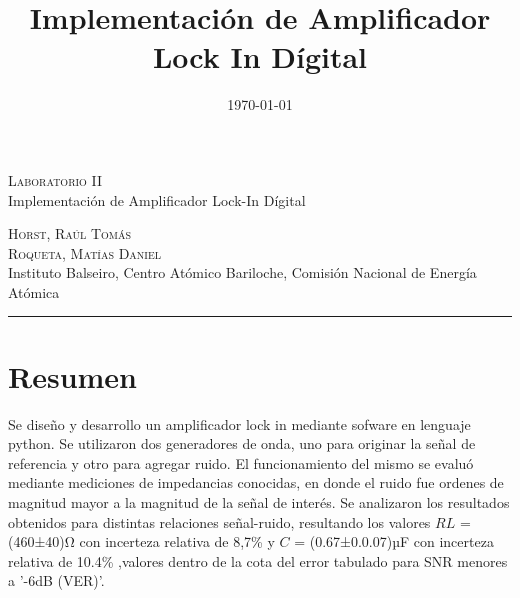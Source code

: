 \documentclass[11pt,a4paper]{extarticle}
\date{\small{\today}}
\begin{document}
\title{Implementación de Amplificador Lock In Dígital}
	\LARGE{\textsc{Laboratorio II}}\\
	\Large{Implementación de Amplificador Lock-In Dígital}\\
\begin{large}
\small\textsc{Horst, Raúl Tomás}\\
\small\textsc{Roqueta, Matías Daniel}\\
\small{Instituto Balseiro, Centro Atómico Bariloche, Comisión Nacional de Energía Atómica}\\
\end{large}
\setcounter{page}{1}

\chead{}

\rfoot{\thepage} 
\renewcommand{\headrulewidth}{0.4pt} 
\renewcommand{\footrulewidth}{0.4pt} 
\pagestyle{fancy}

\hrule
\normalsize
\section{Resumen}
Se diseño y desarrollo un amplificador lock in 
mediante sofware en lenguaje python. 
Se utilizaron dos generadores de onda, uno para originar 
la señal de referencia y otro para agregar ruido. 
El funcionamiento del mismo se evaluó mediante 
mediciones de impedancias conocidas, en donde el ruido 
fue ordenes de magnitud mayor a la magnitud de la señal 
de interés. Se analizaron los
resultados obtenidos para distintas relaciones 
señal-ruido, resultando los valores $RL$ = (460±40)Ω con 
incerteza relativa de 8,7\% y
$C$ = (0.67±0.0.07)µF con incerteza relativa de 10.4\% 
,valores dentro de la cota del error tabulado para 
SNR menores a '-6dB (VER)'.
\end{document}
